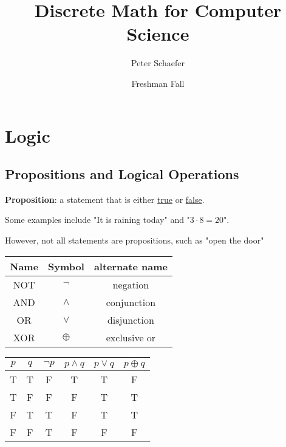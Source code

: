 \documentclass{article}
\title{Discrete Math for Computer Science}
\author{Peter Schaefer}
\date{Freshman Fall}
\begin{document}
\maketitle

\tableofcontents

\newpage

\section{Logic}
\subsection{Propositions and Logical Operations}

\textbf{Proposition}: a statement that is either \underline{true} or \underline{false}.


Some examples include "It is raining today" and "\(3 \cdot 8 = 20 \)".


However, not all statements are propositions, such as "open the door"

\begin{center}
  \begin{tabular}{c|c|c}
    \textbf{Name} & \textbf{Symbol} & \textbf{alternate name} \\
    \hline
    NOT           & $\lnot$         & negation                \\
    AND           & $\land$         & conjunction             \\
    OR            & $\lor$          & disjunction             \\
    XOR           & $\oplus$        & exclusive or            \\
  \end{tabular}
  \qquad
  \begin{tabular}{c|c|c|c|c|c}
    \textbf{$p$} & \textbf{$q$} & \textbf{$\lnot p$} & \textbf{$p \land q$} & \textbf{$p \lor q$} & \textbf{$p \oplus q$} \\
    \hline
    T            & T            & F                  & T                    & T                   & F                     \\
    T            & F            & F                  & F                    & T                   & T                     \\
    F            & T            & T                  & F                    & T                   & T                     \\
    F            & F            & T                  & F                    & F                   & F                     \\
  \end{tabular}
\end{center}
\end{document}
